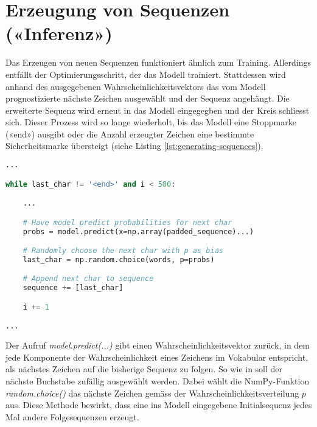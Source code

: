 \section{Erzeugung von Sequenzen («Inferenz»)}
\label{sec:model-generation}

Das Erzeugen von neuen Sequenzen funktioniert ähnlich zum Training.
Allerdings entfällt der Optimierungsschritt, der das Modell trainiert.
Stattdessen wird anhand des ausgegebenen Wahrscheinlichkeitsvektors das vom Modell prognostizierte nächste Zeichen
ausgewählt und der Sequenz angehängt.
Die erweiterte Sequenz wird erneut in das Modell eingegegben und der Kreis schliesst sich.
Dieser Prozess wird so lange wiederholt, bis das Modell eine Stoppmarke («end») ausgibt oder die Anzahl erzeugter Zeichen eine bestimmte Sicherheitsmarke übersteigt (siehe Listing \ref{lst:generating-sequences}).

\begin{lstlisting}[language=Python, caption=Erzeugung von Sequenzen, label=lst:generating-sequences]
...

while last_char != '<end>' and i < 500:

    ...

    # Have model predict probabilities for next char
    probs = model.predict(x=np.array(padded_sequence)...)

    # Randomly choose the next char with p as bias
    last_char = np.random.choice(words, p=probs)

    # Append next char to sequence
    sequence += [last_char]

    i += 1

...
\end{lstlisting}

Der Aufruf \textit{model.predict(...)} gibt einen Wahrscheinlichkeitsvektor zurück, in dem jede Komponente der Wahrscheinlichkeit eines Zeichens im Vokabular entspricht, als nächstes Zeichen auf die bisherige Sequenz zu folgen.
So wie in \autocite{dabbura} soll der nächste Buchstabe zufällig ausgewählt werden.
Dabei wählt die NumPy-Funktion \textit{random.choice()} das nächste Zeichen gemäss der Wahrscheinlichkeitsverteilung $ p $ aus.
Diese Methode bewirkt, dass eine ins Modell eingegebene Initialsequenz jedes Mal andere Folgesequenzen erzeugt.

